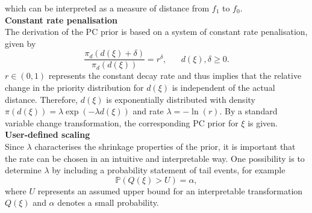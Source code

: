 \documentclass[12pt]{book}
\begin{document}
which can be interpreted as a measure of distance from $f_1$ to $f_0$.
\vspace{6pt}\\
\textbf{Constant rate penalisation}\vspace{6pt}\\
The derivation of the PC prior is based on a system of constant rate penalisation, given by
\begin{equation}
    \frac{\pi_d\left(d\left(\xi\right)+\delta\right)}{\pi_d\left(d\left(\xi\right)\right)}=r^{\delta}, \hspace{20pt} d\left(\xi\right),\delta\geq0.
\end{equation}
$r\in\left(0,1\right)$ represents the constant decay rate and thus implies that the relative change in the priority distribution for $d\left(\xi\right)$ is independent of the actual distance. Therefore, $d\left(\xi\right)$ is exponentially distributed with density $\pi\left(d\left(\xi\right)\right)=\lambda\exp\left(-\lambda d\left(\xi\right)\right)$ and rate $\lambda = -\ln\left(r\right)$. By a standard variable change transformation, the corresponding PC prior for $\xi$ is given.
\vspace{6pt}\\
\textbf{User-defined scaling}\vspace{6pt}\\
Since $\lambda$ characterises the shrinkage properties of the prior, it is important that the rate can be chosen in an intuitive and interpretable way. One possibility is to determine $\lambda$ by including a probability statement of tail events, for example
\begin{equation}
    \mathbb{P}\left(Q\left(\xi\right) > U\right)=\alpha,
\end{equation}
where $U$ represents an assumed upper bound for an interpretable transformation $Q\left(\xi\right)$ and $\alpha$ denotes a small probability.
\end{document}
